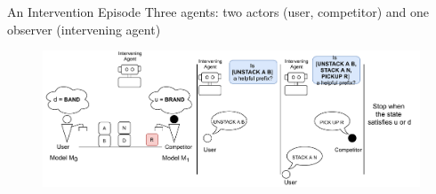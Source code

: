\begin{frame}{An Intervention Episode}
Three agents: two actors (user, competitor) and one observer (intervening agent)
\begin{figure}[!ht]
  \centering
\includegraphics[width=1.1\columnwidth]{img/InterventionEpisode.pdf}
\end{figure}
\end{frame}